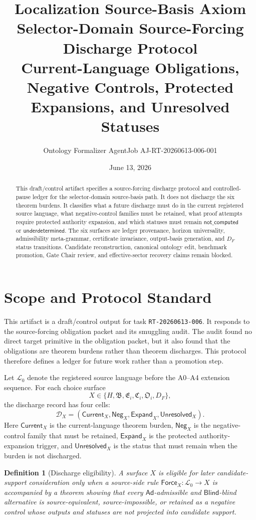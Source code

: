 \documentclass[11pt]{article}
\title{\textbf{Localization Source-Basis Axiom Selector-Domain Source-Forcing Discharge Protocol}\\[0.35em]
\large Current-Language Obligations, Negative Controls, Protected Expansions, and Unresolved Statuses}
\author{Ontology Formalizer AgentJob AJ-RT-20260613-006-001}
\date{June 13, 2026}
\newcommand{\Lang}{\mathcal{L}_{0}}
\newcommand{\HorizonFam}{\mathfrak{B}}
\newcommand{\EnumFam}{\mathfrak{E}}
\newcommand{\CertFam}{\mathfrak{C}}
\newcommand{\OutFam}{\mathfrak{O}}
\newcommand{\Ad}{\mathsf{Ad}}
\newcommand{\Blind}{\mathsf{Blind}}
\newcommand{\Force}{\mathsf{Force}}
\newcommand{\Neg}{\mathsf{Neg}}
\newcommand{\Current}{\mathsf{Current}}
\newcommand{\Expand}{\mathsf{Expand}}
\newcommand{\Unres}{\mathsf{Unresolved}}
\newtheorem{definitionblock}{Definition}
\begin{document}
\maketitle

\begin{abstract}
This draft/control artifact specifies a source-forcing discharge protocol and
controlled-pause ledger for the selector-domain source-basis path. It does
not discharge the six theorem burdens. It classifies what a future discharge
must do in the current registered source language, what negative-control
families must be retained, what proof attempts require protected authority
expansion, and which statuses must remain \(\mathsf{not\_computed}\) or
\(\mathsf{underdetermined}\). The six surfaces are ledger provenance,
horizon universality, admissibility meta-grammar, certificate invariance,
output-basis generation, and \(D_F\) status transitions. Candidate
reconstruction, canonical ontology edit, benchmark promotion, Gate Chair
review, and effective-sector recovery claims remain blocked.
\end{abstract}

\section{Scope and Protocol Standard}

This artifact is a draft/control output for task \texttt{RT-20260613-006}.
It responds to the source-forcing obligation packet and its smuggling audit.
The audit found no direct target primitive in the obligation packet, but it
also found that the obligations are theorem burdens rather than theorem
discharges. This protocol therefore defines a ledger for future work rather
than a promotion step.

Let \(\Lang\) denote the registered source language before the A0--A4
extension sequence. For each choice surface
\[
X\in\{H,\HorizonFam,\EnumFam_i,\CertFam_i,\OutFam_i,D_F\},
\]
the discharge record has four cells:
\[
\mathcal{D}_X=(\Current_X,\Neg_X,\Expand_X,\Unres_X).
\]
Here \(\Current_X\) is the current-language theorem burden, \(\Neg_X\) is the
negative-control family that must be retained, \(\Expand_X\) is the protected
authority-expansion trigger, and \(\Unres_X\) is the status that must remain
when the burden is not discharged.

\begin{definitionblock}[Discharge eligibility]
A surface \(X\) is eligible for later candidate-support consideration only
when a source-side rule \(\Force_X:\Lang\to X\) is accompanied by a theorem
showing that every \(\Ad\)-admissible and \(\Blind\)-blind alternative is
source-equivalent, source-impossible, or retained as a negative control whose
outputs and statuses are not projected into candidate support.
\end{definitionblock}
\end{document}
